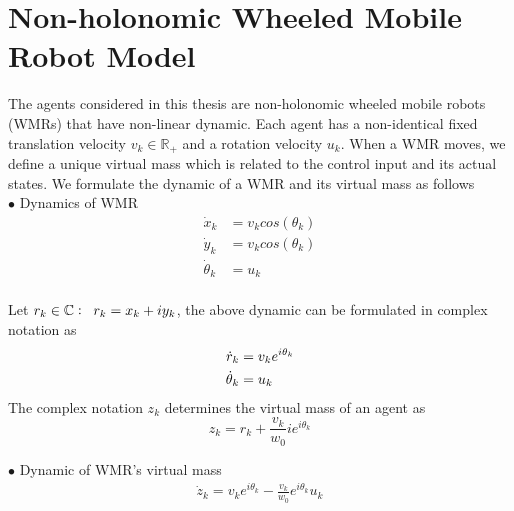 \section{Non-holonomic Wheeled Mobile Robot Model}
\noindent The agents considered in this thesis are non-holonomic wheeled mobile robots (WMRs) that have non-linear dynamic. Each agent has a non-identical fixed translation velocity ${v_k \in \mathbb{R}_{+}}$ and a rotation velocity ${u_{k}}$. When a WMR moves, we define a unique virtual mass which is related to the control input and its actual states. We formulate the dynamic of a WMR and its virtual mass as follows\\ 
\noindent $\bullet$ Dynamics of WMR %
\begin{equation} \label{WMR_dynamic}
\begin{split}
\dot{x}_{k} & = v_{k} cos(\theta_{k})  \\
\dot{y}_{k} & = v_{k} cos(\theta_{k})  \\
\dot{\theta}_{k} & = u_{k} \\
\end{split}
\end{equation}

\noindent Let $r_k \in \mathbb{C}:\txtspc{ }r_k = x_k + iy_k $, the above dynamic can be formulated in complex notation as 
\begin{equation} \notag
\begin{split}
\dot{r}_{k} & = v_{k} e^{i \theta_{k}} \\
\dot{\theta}_{k} & = u_{k} \\
\end{split}
\end{equation}
\noindent The complex notation $z_k$ determines the virtual mass of an agent as
\[z_k = r_k + \frac{v_k}{w_0}ie^{i\theta_{k}}\]

\noindent $\bullet$  Dynamic of WMR's virtual mass %
\begin{equation} \label{VM_dynamic}
\begin{split}
\dot{z}_{k} = v_k e^{i\theta_{k}} - \frac{v_k}{w_0}e^{i\theta_{k}}u_k \\
\end{split}
\end{equation}




